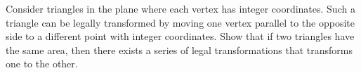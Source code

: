 Consider triangles in the plane where each vertex has integer coordinates. Such a triangle can be legally transformed by moving one vertex parallel to the opposite side to a different point with integer coordinates. Show that if two triangles have the same area, then there exists a series of legal transformations that transforms one to the other.